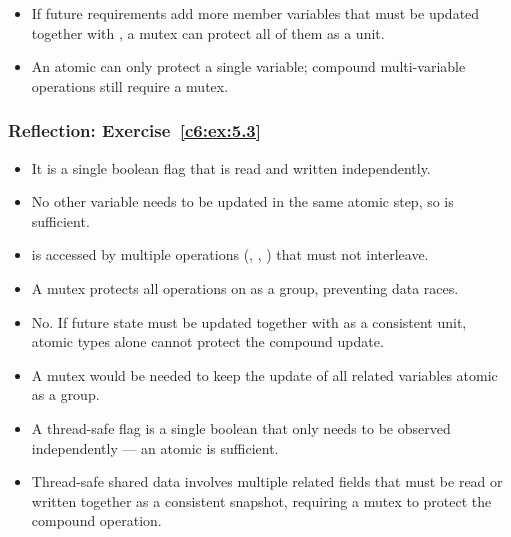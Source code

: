 \begin{itemize}
  \item If future requirements add more member variables that must be updated together with
    , a mutex can protect all of them as a unit.
  \item An atomic can only protect a single variable; compound multi-variable operations still
    require a mutex.
\end{itemize}

\subsubsection{Reflection: Exercise~\ref{c6:ex:5.3}}
\begin{itemize}
  \item It is a single boolean flag that is read and written independently.
  \item No other variable needs to be updated in the same atomic step, so
     is sufficient.
\end{itemize}

\begin{itemize}
  \item {} is accessed by multiple operations (, ,
    ) that must not interleave.
  \item A mutex protects all operations on  as a group, preventing data races.
\end{itemize}

\begin{itemize}
  \item No. If future state must be updated together with  as a consistent unit,
    atomic types alone cannot protect the compound update.
  \item A mutex would be needed to keep the update of all related variables atomic as a group.
\end{itemize}

\begin{itemize}
  \item A thread-safe flag is a single boolean that only needs to be observed independently --- an
    atomic is sufficient.
  \item Thread-safe shared data involves multiple related fields that must be read or written
    together as a consistent snapshot, requiring a mutex to protect the compound operation.
\end{itemize}

